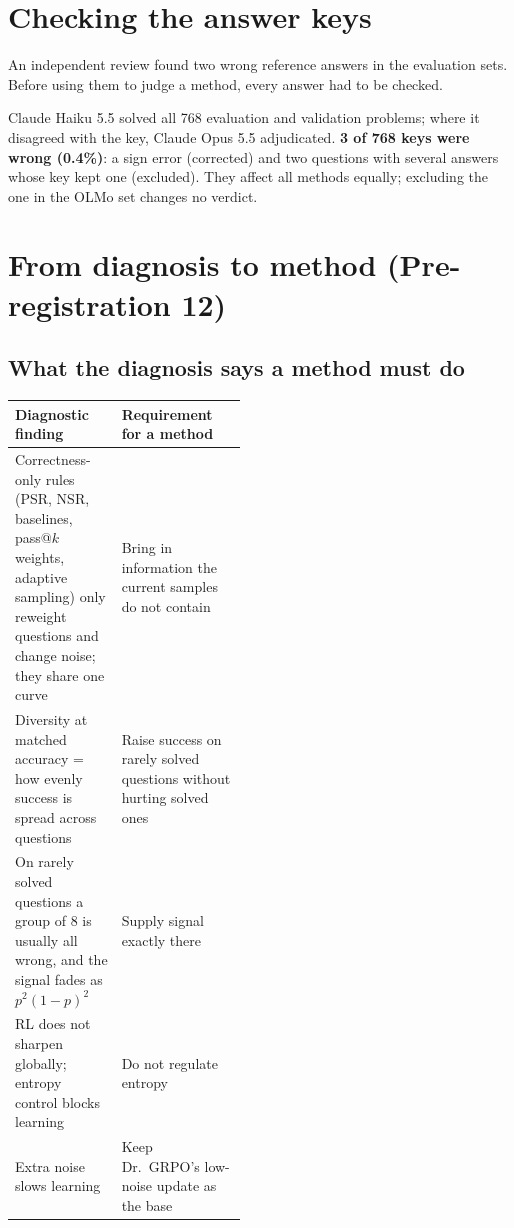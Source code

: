 \documentclass[11pt]{article}
\begin{document}
\section{Checking the answer keys}
\begin{why}
An independent review found two wrong reference answers in the evaluation sets. Before using them to judge a method, every answer had to be checked.
\end{why}
\begin{found}
Claude Haiku 5.5 solved all 768 evaluation and validation problems; where it disagreed with the key, Claude Opus 5.5 adjudicated. \textbf{3 of 768 keys were wrong (0.4\%)}: a sign error (corrected) and two questions with several answers whose key kept one (excluded). They affect all methods equally; excluding the one in the OLMo set changes no verdict.
\end{found}

\section{From diagnosis to method (Pre-registration 12)}\label{sec:p12}
\subsection{What the diagnosis says a method must do}
\begin{center}\small
\begin{tabularx}{\linewidth}{@{}P{0.46\linewidth}Y@{}}
\toprule
\textbf{Diagnostic finding} & \textbf{Requirement for a method}\\
\midrule
Correctness-only rules (PSR, NSR, baselines, pass@$k$ weights, adaptive sampling) only reweight questions and change noise; they share one curve & Bring in information the current samples do not contain\\
Diversity at matched accuracy = how evenly success is spread across questions & Raise success on rarely solved questions without hurting solved ones\\
On rarely solved questions a group of 8 is usually all wrong, and the signal fades as $p^2(1-p)^2$ & Supply signal exactly there\\
RL does not sharpen globally; entropy control blocks learning & Do not regulate entropy\\
Extra noise slows learning & Keep Dr.\ GRPO's low-noise update as the base\\
\bottomrule
\end{tabularx}
\end{center}
\end{document}
